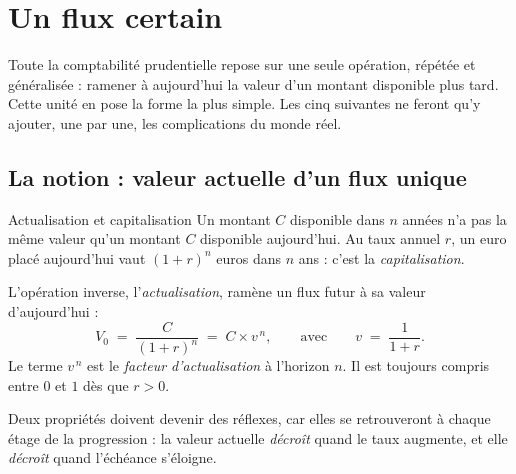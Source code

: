 \section{Un flux certain}
\label{sec:U1}

Toute la comptabilité prudentielle repose sur une seule opération, répétée et
généralisée : ramener à aujourd'hui la valeur d'un montant disponible plus tard.
Cette unité en pose la forme la plus simple. Les cinq suivantes ne feront
qu'y ajouter, une par une, les complications du monde réel.

\subsection{La notion : valeur actuelle d'un flux unique}

\begin{notion}{Actualisation et capitalisation}
Un montant $C$ disponible dans $n$ années n'a pas la même valeur qu'un montant
$C$ disponible aujourd'hui. Au taux annuel $r$, un euro placé aujourd'hui vaut
$(1+r)^n$ euros dans $n$ ans : c'est la \emph{capitalisation}.

L'opération inverse, l'\emph{actualisation}, ramène un flux
futur à sa valeur d'aujourd'hui :
\[
  V_0 \;=\; \frac{C}{(1+r)^n} \;=\; C \times v^{\,n},
  \qquad\text{avec}\qquad v \;=\; \frac{1}{1+r}.
\]
Le terme $v^{\,n}$ est le \emph{facteur d'actualisation}
à l'horizon $n$. Il est toujours compris entre $0$ et $1$ dès que $r>0$.
\end{notion}

Deux propriétés doivent devenir des réflexes, car elles se retrouveront à chaque
étage de la progression : la valeur actuelle \emph{décroît} quand le taux
augmente, et elle \emph{décroît} quand l'échéance s'éloigne.

\begin{center}
\end{center}

